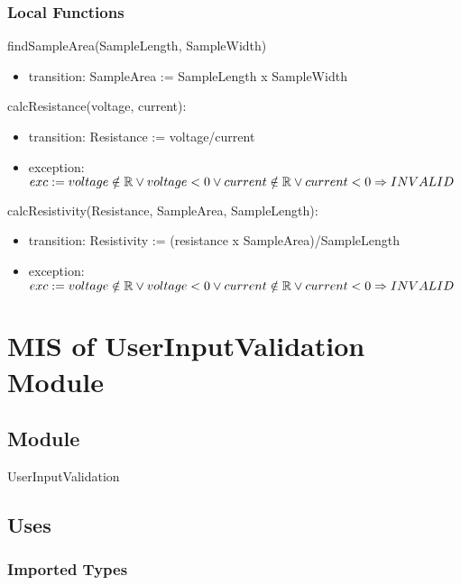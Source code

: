\documentclass[12pt, titlepage]{article}
\begin{document}
\subsubsection{Local Functions}

findSampleArea(SampleLength, SampleWidth)
\begin{itemize}
  \item transition: SampleArea := SampleLength x SampleWidth
  \end{itemize}

  \noindent calcResistance(voltage, current):
  \begin{itemize}
  \item transition: Resistance := voltage/current 
  \item exception: $exc:= \\ 
  voltage \notin \mathbb{R} \lor voltage < 0 \\ 
  \lor current \notin \mathbb{R} \lor current < 0\\
   \Rightarrow INVALID$
  \end{itemize}
  
  \noindent calcResistivity(Resistance, SampleArea, SampleLength):
  \begin{itemize}
  \item transition: Resistivity := (resistance x SampleArea)/SampleLength
  \item exception: $exc:= \\ 
  voltage \notin \mathbb{R} \lor voltage < 0 \\ 
  \lor current \notin \mathbb{R} \lor current < 0\\
   \Rightarrow INVALID$
  \end{itemize}
\newpage

\section{MIS of UserInputValidation Module} \label{UI} 



\subsection{Module}

UserInputValidation

\subsection{Uses}

\subsubsection{Imported Types}
\end{document}
